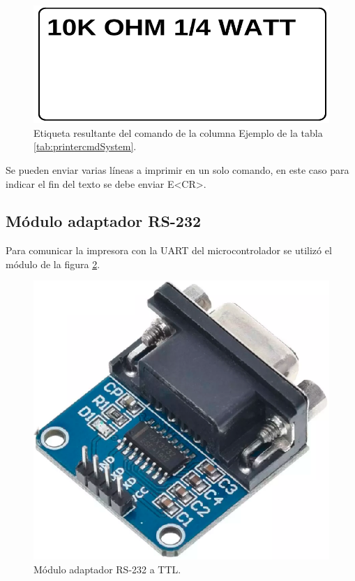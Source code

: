 \begin{figure}[htpb]
	\centering
	\includegraphics[scale=0.3]{./Figures/label_ej.png}
	\caption{Etiqueta resultante del comando de la columna Ejemplo de la tabla \ref{tab:printercmdSystem}.}
	\label{fig:label_ej}
\end{figure}

Se pueden enviar varias líneas a imprimir en un solo comando, en este caso para indicar el fin del texto se debe enviar E\textless{}CR\textgreater.

\subsection{Módulo adaptador RS-232}
\label{subsec:Mod232}
Para comunicar la impresora con la UART del microcontrolador se utilizó el módulo de la figura \ref{fig:rs232}. 

\begin{figure}[hb]
	\centering
	\includegraphics[scale=0.3]{./Figures/rs3232.png}
	\caption{Módulo adaptador RS-232 a TTL.}
	\label{fig:rs232}
\end{figure}

